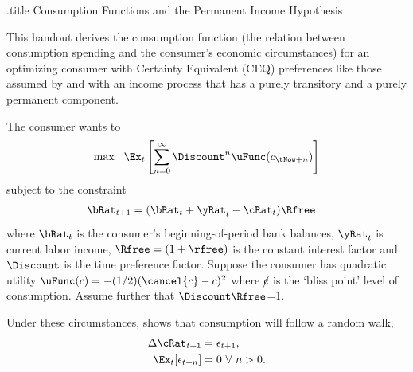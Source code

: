 \documentclass{handout}
\begin{document}
\handoutHeader

\begin{verbatimwrite}{\jobname.title}
Consumption Functions and the Permanent Income Hypothesis
\end{verbatimwrite}

\handoutNameMake

This handout derives the consumption function (the relation between
consumption spending and the consumer's economic circumstances) for an
optimizing consumer with Certainty Equivalent (CEQ) preferences like
those assumed by \cite{hallRandomWalk} and with an income process
that has a purely transitory and a purely permanent component.

The consumer wants to 
\begin{equation}
\max ~~ \Ex_{t}\left[\sum_{n=0}^{\infty} \Discount^{n} \uFunc({c}_{\tNow+n})\right]
\end{equation}
subject to the constraint
\begin{equation}\begin{gathered}\begin{aligned}
        \bRat_{t+1} & =  (\bRat_{t}+\yRat_{t}-\cRat_{t})\Rfree
\end{aligned}\end{gathered}\end{equation}
where $\bRat_{t}$ is the consumer's beginning-of-period bank balances, $\yRat_{t}$ is 
current labor income, $\Rfree=(1+\rfree)$ is the constant interest factor and 
$\Discount$ is the time preference factor.  Suppose the consumer has quadratic utility 
$\uFunc({c}) = -(1/2)(\cancel{c}-c)^{2}$ where $\cancel{c}$ is the `bliss point' 
level of consumption.  Assume further that $\Discount \Rfree$=1.

Under these circumstances,  shows that 
consumption will follow a random walk, 
\begin{equation}\begin{gathered}\begin{aligned}
\Delta \cRat_{t+1} & =  \epsilon_{t+1}, \label{eq:rwc}
\\ \Ex_{t}[\epsilon_{t+n}] & =  0 ~\forall~n>0.
\end{aligned}\end{gathered}\end{equation}
\end{document}
